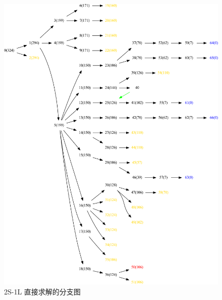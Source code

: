 \begin{figure}[htbp]
\centering
\includegraphics[width=\textwidth]{fig/2S1L-dir-number.pdf}
\caption{2S-1L 直接求解的分支图}\label{sb2-d}
\end{figure}

